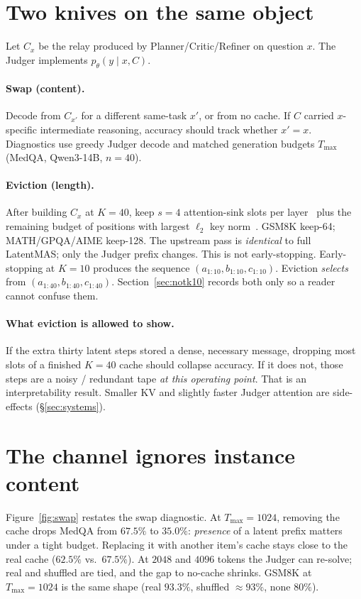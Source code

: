 \documentclass[11pt]{article}
\begin{document}
\section{Two knives on the same object}
\label{sec:protocol}

Let $C_x$ be the relay produced by Planner/Critic/Refiner on question $x$.
The Judger implements $p_\theta(y\mid x, C)$.

\paragraph{Swap (content).}
Decode from $C_{x'}$ for a different same-task $x'$, or from no cache.
If $C$ carried $x$-specific intermediate reasoning, accuracy should track
whether $x'=x$. Diagnostics use greedy Judger decode and matched
generation budgets $T_{\max}$ (MedQA, Qwen3-14B, $n{=}40$).

\paragraph{Eviction (length).}
After building $C_x$ at $K{=}40$, keep $s{=}4$ attention-sink slots per
layer~\citep{xiao2024streamingllm} plus the remaining budget of positions
with largest $\ell_2$ key norm~\citep{zhang2023h2o}.
GSM8K keep-64; MATH/GPQA/AIME keep-128. The upstream pass is
\emph{identical} to full LatentMAS; only the Judger prefix changes.
This is not early-stopping. Early-stopping at $K{=}10$ produces the
sequence $(a_{1:10},b_{1:10},c_{1:10})$. Eviction \emph{selects} from
$(a_{1:40},b_{1:40},c_{1:40})$. Section~\ref{sec:notk10} records both
only so a reader cannot confuse them.

\paragraph{What eviction is allowed to show.}
If the extra thirty latent steps stored a dense, necessary message, dropping
most slots of a finished $K{=}40$ cache should collapse accuracy. If it does
not, those steps are a noisy / redundant tape \emph{at this operating point}.
That is an interpretability result. Smaller KV and slightly faster Judger
attention are side-effects (\S\ref{sec:systems}).

\section{The channel ignores instance content}
\label{sec:swap}

Figure~\ref{fig:swap} restates the swap diagnostic.
At $T_{\max}{=}1024$, removing the cache drops MedQA from $67.5\%$ to
$35.0\%$: \emph{presence} of a latent prefix matters under a tight budget.
Replacing it with another item's cache stays close to the real cache
($62.5\%$ vs.\ $67.5\%$). At $2048$ and $4096$ tokens the Judger can
re-solve; real and shuffled are tied, and the gap to no-cache shrinks.
GSM8K at $T_{\max}{=}1024$ is the same shape (real $93.3\%$, shuffled
${\approx}93\%$, none $80\%$).
\end{document}
